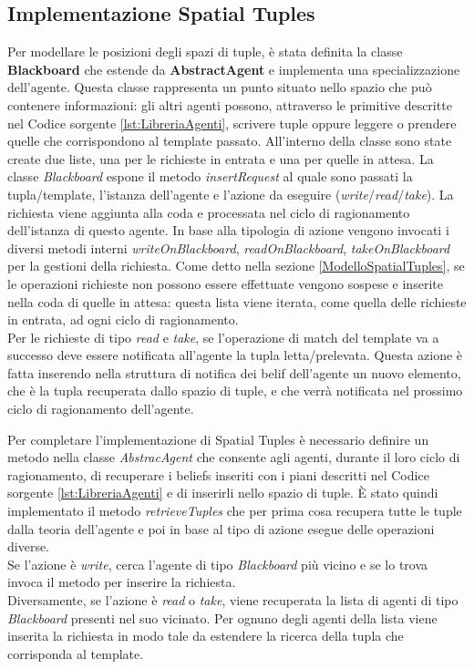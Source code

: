 \documentclass[12pt,a4paper,openright,twoside]{report}
\begin{document}
\subsection{Implementazione Spatial Tuples}
Per modellare le posizioni degli spazi di tuple, \`e stata definita la classe \textbf{Blackboard} che estende da \textbf{AbstractAgent} e implementa una specializzazione dell'agente. Questa classe rappresenta un punto situato nello spazio che pu\`o contenere informazioni: gli altri agenti possono, attraverso le primitive descritte nel Codice sorgente \ref{lst:LibreriaAgenti}, scrivere tuple oppure leggere o prendere quelle che corrispondono al template passato.
All'interno della classe sono state create due liste, una per le richieste in entrata e una per quelle in attesa. La classe \textit{Blackboard} espone il metodo \textit{insertRequest} al quale sono passati la tupla/template, l'istanza dell'agente e l'azione da eseguire (\textit{write}/\textit{read}/\textit{take}). La richiesta viene aggiunta alla coda e processata nel ciclo di ragionamento dell'istanza di questo agente. In base alla tipologia di azione vengono invocati i diversi metodi interni \textit{writeOnBlackboard}, \textit{readOnBlackboard}, \textit{takeOnBlackboard} per la gestioni della richiesta.
Come detto nella sezione \ref{ModelloSpatialTuples}, se le operazioni richieste non possono essere effettuate vengono sospese e inserite nella coda di quelle in attesa: questa lista viene iterata, come quella delle richieste in entrata, ad ogni ciclo di ragionamento.
\\
Per le richieste di tipo \textit{read} e \textit{take}, se l'operazione di match del template va a successo deve essere notificata all'agente la tupla letta/prelevata. Questa azione \`e fatta inserendo nella struttura di notifica dei belif dell'agente un nuovo elemento, che \`e la tupla recuperata dallo spazio di tuple, e che verr\`a notificata nel prossimo ciclo di ragionamento dell'agente.

Per completare l'implementazione di Spatial Tuples \`e necessario definire un metodo nella classe \textit{AbstracAgent} che consente agli agenti, durante il loro ciclo di ragionamento, di recuperare i beliefs inseriti con i piani descritti nel Codice sorgente \ref{lst:LibreriaAgenti} e di inserirli nello spazio di tuple. \`E stato quindi implementato il metodo \textit{retrieveTuples} che per prima cosa recupera tutte le tuple dalla teoria dell'agente e poi in base al tipo di azione esegue delle operazioni diverse.
\\
Se l'azione \`e \textit{write}, cerca l'agente di tipo \textit{Blackboard} pi\`u vicino e se lo trova invoca il metodo per inserire la richiesta.
\\
Diversamente, se l'azione \`e \textit{read} o \textit{take}, viene recuperata la lista di agenti di tipo \textit{Blackboard} presenti nel suo vicinato. Per ognuno degli agenti della lista viene inserita la richiesta in modo tale da estendere la ricerca della tupla che corrisponda al template.
\end{document}
